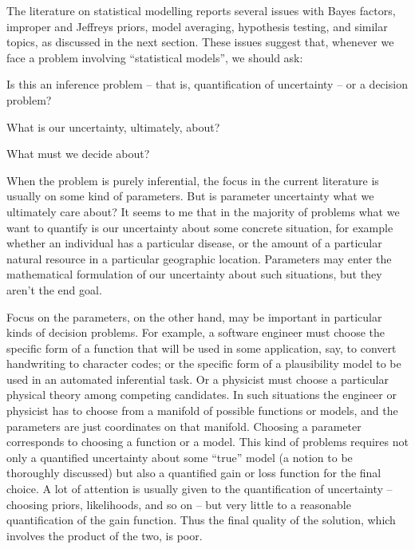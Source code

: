 \documentclass[\ifafour a4paper,12pt,\else a5paper,10pt,\fi%
onecolumn,oneside,article,%
british%
]{memoir}
\theoremstyle{remark}
\theoremstyle{innote}
\newcommand*{\citep}{\parencites}
\renewcommand*{\|}{\nonscript\,\vert\nonscript\;\mathopen{}}
\begin{document}
The literature on statistical modelling reports several issues with Bayes
factors, improper and Jeffreys priors, model averaging, hypothesis testing,
and similar topics, as discussed in the next section. These issues suggest
that, whenever we face a problem involving \enquote{statistical models}, we
should ask:
\begin{enumerate*}[(\arabic*)]
\item Is this an inference problem -- that is, quantification of
  uncertainty -- or a decision problem?
\item What is our uncertainty, ultimately, about?
\item What must we decide about?
\end{enumerate*}

When the problem is purely inferential, the focus in the current literature
is usually on some kind of parameters. But is parameter uncertainty what we
ultimately care about? It seems to me that in the majority of problems what
we want to quantify is our uncertainty about some concrete situation, for
example whether an individual has a particular disease, or the amount of a
particular natural resource in a particular geographic location. Parameters
may enter the mathematical formulation of our uncertainty about such situations,
but they aren't the end goal.

Focus on the parameters, on the other hand, may be important in particular
kinds of decision problems. For example, a software engineer must choose
the specific form of a function that will be used in some application, say,
to convert handwriting to character codes; or the specific form of a
plausibility model to be used in an automated inferential task. Or a
physicist must choose a particular physical theory \citep[a problem
especially considered by][]{jeffreys1931_r1973,jeffreys1939_r1983} among
competing candidates. In such situations the engineer or physicist has to
choose from a manifold of possible functions or models, and the parameters
are just coordinates on that manifold. Choosing a parameter corresponds to
choosing a function or a model. This kind of problems requires not only a
quantified uncertainty about some \enquote{true} model (a notion to be
thoroughly discussed) but also a quantified gain or loss function for the
final choice. A lot of attention is usually given to the quantification of
uncertainty -- choosing priors, likelihoods, and so on -- but very little
to a reasonable quantification of the gain function. Thus the final quality
of the solution, which involves the product of the two, is poor.
\end{document}
